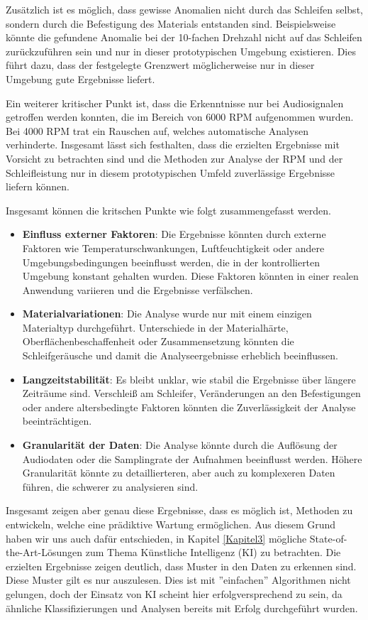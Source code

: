 Zusätzlich ist es möglich, dass gewisse Anomalien nicht durch das Schleifen selbst, sondern durch die Befestigung des Materials entstanden sind. Beispielsweise könnte die gefundene Anomalie bei der 10-fachen Drehzahl nicht auf das Schleifen zurückzuführen sein und nur in dieser prototypischen Umgebung existieren. Dies führt dazu, dass der festgelegte Grenzwert möglicherweise nur in dieser Umgebung gute Ergebnisse liefert. 

Ein weiterer kritischer Punkt ist, dass die Erkenntnisse nur bei Audiosignalen getroffen werden konnten, die im Bereich von 6000 RPM aufgenommen wurden. Bei 4000 RPM trat ein Rauschen auf, welches automatische Analysen verhinderte. Insgesamt lässt sich festhalten, dass die erzielten Ergebnisse mit Vorsicht zu betrachten sind und die Methoden zur Analyse der RPM und der Schleifleistung nur in diesem prototypischen Umfeld zuverlässige Ergebnisse liefern können.

Insgesamt können die kritschen Punkte wie folgt zusammengefasst werden.
\begin{itemize}
    \item \textbf{Einfluss externer Faktoren}: Die Ergebnisse könnten durch externe Faktoren wie Temperaturschwankungen, Luftfeuchtigkeit oder andere Umgebungsbedingungen beeinflusst werden, die in der kontrollierten Umgebung konstant gehalten wurden. Diese Faktoren könnten in einer realen Anwendung variieren und die Ergebnisse verfälschen.
    \item \textbf{Materialvariationen}: Die Analyse wurde nur mit einem einzigen Materialtyp durchgeführt. Unterschiede in der Materialhärte, Oberflächenbeschaffenheit oder Zusammensetzung könnten die Schleifgeräusche und damit die Analyseergebnisse erheblich beeinflussen.
    \item \textbf{Langzeitstabilität}: Es bleibt unklar, wie stabil die Ergebnisse über längere Zeiträume sind. Verschleiß am Schleifer, Veränderungen an den Befestigungen oder andere altersbedingte Faktoren könnten die Zuverlässigkeit der Analyse beeinträchtigen.
    \item \textbf{Granularität der Daten}: Die Analyse könnte durch die Auflösung der Audiodaten oder die Samplingrate der Aufnahmen beeinflusst werden. Höhere Granularität könnte zu detaillierteren, aber auch zu komplexeren Daten führen, die schwerer zu analysieren sind.
\end{itemize}

Insgesamt zeigen aber genau diese Ergebnisse, dass es möglich ist, Methoden zu entwickeln, welche eine prädiktive Wartung ermöglichen. Aus diesem Grund haben wir uns auch dafür entschieden, in Kapitel \ref{Kapitel3} mögliche State-of-the-Art-Lösungen zum Thema Künstliche Intelligenz (KI) zu betrachten. Die erzielten Ergebnisse zeigen deutlich, dass Muster in den Daten zu erkennen sind. Diese Muster gilt es nur auszulesen. Dies ist mit ''einfachen'' Algorithmen nicht gelungen, doch der Einsatz von KI scheint hier erfolgversprechend zu sein, da ähnliche Klassifizierungen und Analysen bereits mit Erfolg durchgeführt wurden.

